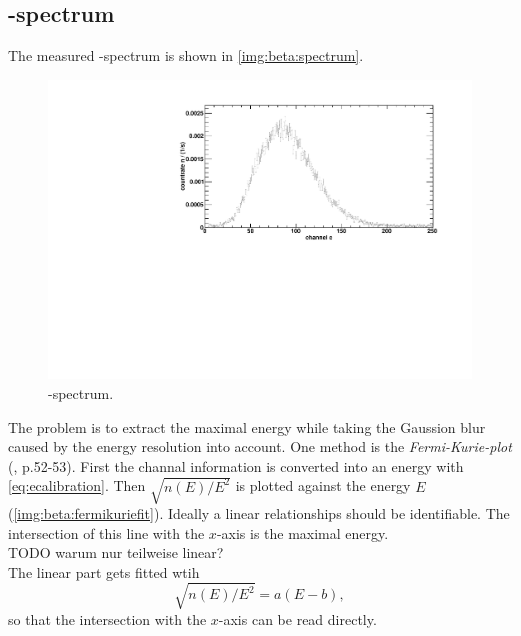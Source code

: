 \subsection{\textbeta-spectrum}
The measured \textbeta-spectrum is shown in \autoref{img:beta:spectrum}.
\begin{figure}[H]
\begin{center}
  \includegraphics[width=\textwidth]{../img/betaspectrum.pdf}
  \caption{\textbeta-spectrum.}
  \label{img:beta:spectrum}
\end{center}
\end{figure}
The problem is to extract the maximal energy while taking the Gaussion blur caused by the energy resolution into account. One method is the 
\emph{Fermi-Kurie-plot} (\cite{dem4}, p.52-53).
First the channal information is converted into an energy with \autoref{eq:ecalibration}. Then $\sqrt{n(E)/E^2}$ is plotted against 
the energy $E$ (\autoref{img:beta:fermikuriefit}). Ideally a linear relationships should be identifiable. The intersection of this line with 
the $x$-axis is the maximal energy. \\
TODO warum nur teilweise linear? \\ %
The linear part gets fitted wtih
\begin{equation}
    \sqrt{n(E)/E^2} = a(E-b),
\end{equation}
so that the intersection with the $x$-axis can be read directly.

